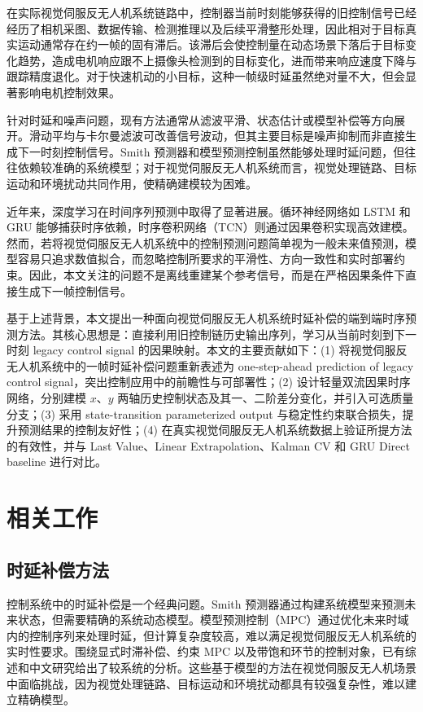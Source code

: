 \documentclass[journal]{IEEEtran}
\begin{document}
在实际视觉伺服反无人机系统链路中，控制器当前时刻能够获得的旧控制信号已经经历了相机采图、数据传输、检测推理以及后续平滑整形处理，因此相对于目标真实运动通常存在约一帧的固有滞后。该滞后会使控制量在动态场景下落后于目标变化趋势，造成电机响应跟不上摄像头检测到的目标变化，进而带来响应速度下降与跟踪精度退化。对于快速机动的小目标，这种一帧级时延虽然绝对量不大，但会显著影响电机控制效果。

针对时延和噪声问题，现有方法通常从滤波平滑、状态估计或模型补偿等方向展开。滑动平均与卡尔曼滤波\cite{kalman1960new,welch1995introduction}可改善信号波动，但其主要目标是噪声抑制而非直接生成下一时刻控制信号。Smith 预测器\cite{smith1957closer}和模型预测控制\cite{camacho2013model}虽然能够处理时延问题，但往往依赖较准确的系统模型；对于视觉伺服反无人机系统而言，视觉处理链路、目标运动和环境扰动共同作用，使精确建模较为困难。

近年来，深度学习在时间序列预测中取得了显著进展\cite{lecun2015deep}。循环神经网络如 LSTM\cite{hochreiter1997long} 和 GRU\cite{cho2014learning} 能够捕获时序依赖，时序卷积网络（TCN）\cite{bai2018empirical}则通过因果卷积实现高效建模。然而，若将视觉伺服反无人机系统中的控制预测问题简单视为一般未来值预测，模型容易只追求数值拟合，而忽略控制所要求的平滑性、方向一致性和实时部署约束。因此，本文关注的问题不是离线重建某个参考信号，而是在严格因果条件下直接生成下一帧控制信号。

基于上述背景，本文提出一种面向视觉伺服反无人机系统时延补偿的端到端时序预测方法。其核心思想是：直接利用旧控制链历史输出序列，学习从当前时刻到下一时刻 legacy control signal 的因果映射。本文的主要贡献如下：(1) 将视觉伺服反无人机系统中的一帧时延补偿问题重新表述为 one-step-ahead prediction of legacy control signal，突出控制应用中的前瞻性与可部署性；(2) 设计轻量双流因果时序网络，分别建模 $x$、$y$ 两轴历史控制状态及其一、二阶差分变化，并引入可选质量分支；(3) 采用 state-transition parameterized output 与稳定性约束联合损失，提升预测结果的控制友好性；(4) 在真实视觉伺服反无人机系统数据上验证所提方法的有效性，并与 Last Value、Linear Extrapolation、Kalman CV 和 GRU Direct baseline 进行对比。

\section{相关工作}

\subsection{时延补偿方法}
控制系统中的时延补偿是一个经典问题。Smith 预测器\cite{smith1957closer}通过构建系统模型来预测未来状态，但需要精确的系统动态模型。模型预测控制（MPC）\cite{camacho2013model}通过优化未来时域内的控制序列来处理时延，但计算复杂度较高，难以满足视觉伺服反无人机系统的实时性要求。围绕显式时滞补偿、约束 MPC 以及带饱和环节的控制对象，已有综述和中文研究给出了较系统的分析\cite{normey2009taking,xi2013mpc_cn,li2006saturatedmpc_cn,chen2007timedelaympc_cn}。这些基于模型的方法在视觉伺服反无人机场景中面临挑战，因为视觉处理链路、目标运动和环境扰动都具有较强复杂性，难以建立精确模型。
\end{document}
